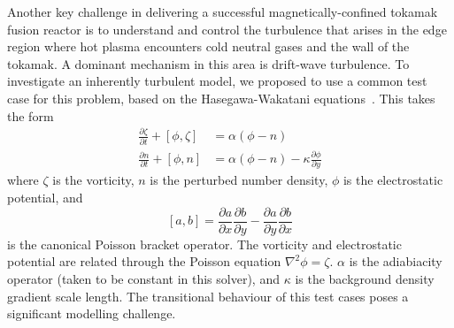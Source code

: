 \documentclass{article}
\begin{document}
Another key challenge in delivering a successful magnetically-confined tokamak
fusion reactor is to understand and control the turbulence that arises in the
edge region where hot plasma encounters cold neutral gases and the wall of the
tokamak. A dominant mechanism in this area is drift-wave turbulence.  To
investigate an inherently turbulent model, we proposed to use a common test case
for this problem, based on the Hasegawa-Wakatani
equations~\citep{wakatani1984collisional}. This takes the form
%
\begin{align*}
  \frac{\partial\zeta}{\partial t} + [\phi, \zeta] &= \alpha (\phi - n) \\
  \frac{\partial n}{\partial t} + [\phi, n] &= \alpha (\phi - n) - \kappa \frac{\partial\phi}{\partial y}
\end{align*}
%
where $\zeta$ is the vorticity, $n$ is the perturbed number density, $\phi$ is
the electrostatic potential, and
%
\[
  [a,b] = \frac{\partial a}{\partial x} \frac{\partial b}{\partial y} -
  \frac{\partial a}{\partial y} \frac{\partial b}{\partial x}
\]
%
is the canonical Poisson bracket operator. The vorticity and electrostatic
potential are related through the Poisson equation $\nabla^2\phi =
\zeta$. $\alpha$ is the adiabiacity operator (taken to be constant in this
solver), and $\kappa$ is the background density gradient scale length.  The
transitional behaviour of this test cases poses a significant modelling
challenge.



\end{document}
